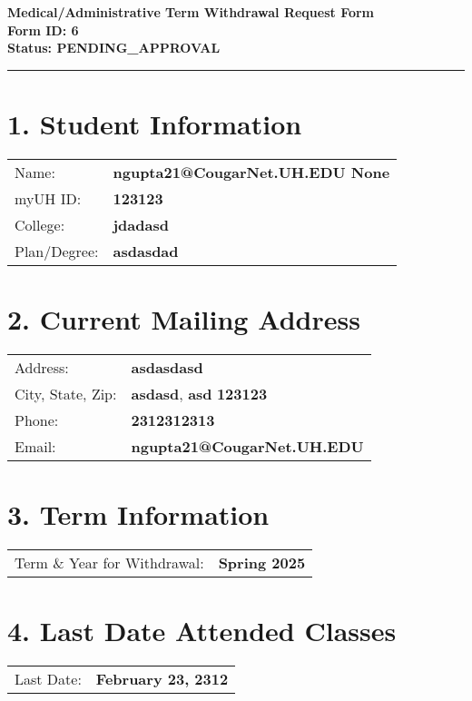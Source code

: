 \documentclass[12pt]{article}
\begin{document}
\begin{center}
  \textbf{\Large Medical/Administrative Term Withdrawal Request Form}\\[0.2cm]
  \textbf{Form ID: 6}\\[0.2cm]
  \textbf{Status: PENDING_APPROVAL}
\end{center}

\hrule
\vspace{0.5cm}

\section*{1. Student Information}
\begin{tabular}{ll}
Name: & \textbf{ngupta21@CougarNet.UH.EDU  None} \\
myUH ID: & \textbf{123123} \\
College: & \textbf{jdadasd} \\
Plan/Degree: & \textbf{asdasdad} \\
\end{tabular}

\vspace{0.5cm}

\section*{2. Current Mailing Address}
\begin{tabular}{ll}
Address: & \textbf{asdasdasd} \\
City, State, Zip: & \textbf{asdasd}, \textbf{asd} \textbf{123123} \\
Phone: & \textbf{2312312313} \\
Email: & \textbf{ngupta21@CougarNet.UH.EDU} \\
\end{tabular}

\vspace{0.5cm}

\section*{3. Term Information}
\begin{tabular}{ll}
Term \& Year for Withdrawal: & \textbf{Spring 2025} \\
\end{tabular}

\vspace{0.5cm}

\section*{4. Last Date Attended Classes}
\begin{tabular}{ll}
Last Date: & \textbf{February 23, 2312} \\
\end{tabular}
\end{document}
